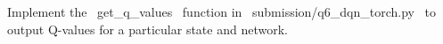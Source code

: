 \item {}
Implement the ~get_q_values~ function in ~submission/q6_dqn_torch.py~ to output Q-values for a particular state and network.